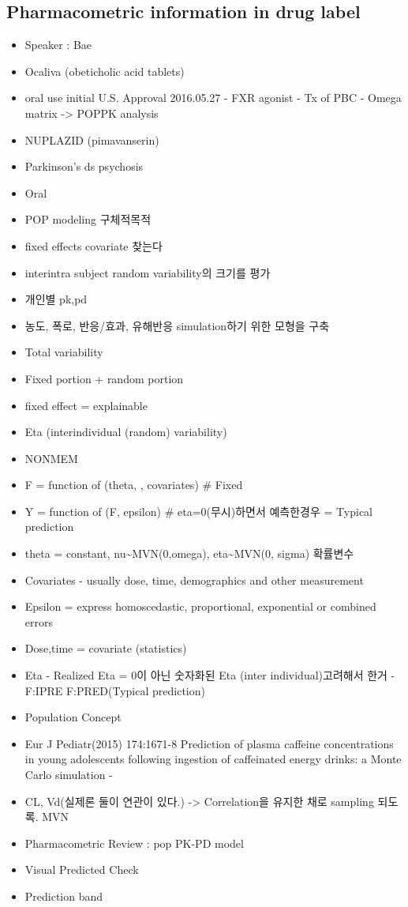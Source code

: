 \documentclass[]{book}
\begin{document}
\subsection{Pharmacometric information in drug
label}\label{pharmacometric-information-in-drug-label}

\begin{itemize}
\item
  Speaker : Bae
\item
  Ocaliva (obeticholic acid tablets)
\item
  oral use \textbar{} initial U.S. Approval 2016.05.27 - FXR agonist -
  Tx of PBC - Omega matrix -\textgreater{} POPPK analysis
\item
  NUPLAZID (pimavanserin)
\item
  Parkinson's ds psychosis
\item
  Oral
\item
  POP modeling 구체적목적
\item
  fixed effects covariate 찾는다
\item
  interintra subject random variability의 크기를 평가
\item
  개인별 pk,pd
\item
  농도, 폭로, 반응/효과, 유해반응 simulation하기 위한 모형을 구축
\item
  Total variability
\item
  Fixed portion + random portion
\item
  fixed effect = explainable
\item
  Eta (interindividual (random) variability)
\item
  NONMEM
\item
  F = function of (theta, , covariates) \# Fixed
\item
  Y = function of (F, epsilon) \# eta=0(무시)하면서 예측한경우 = Typical
  prediction
\item
  theta = constant, nu\textasciitilde{}MVN(0,omega),
  eta\textasciitilde{}MVN(0, sigma) 확률변수
\item
  Covariates - usually dose, time, demographics and other measurement
\item
  Epsilon = express homoscedastic, proportional, exponential or combined
  errors
\item
  Dose,time = covariate (statistics)
\item
  Eta - Realized Eta = 0이 아닌 숫자화된 Eta (inter individual)고려해서
  한거 - F:IPRE F:PRED(Typical prediction)
\item
  Population Concept
\item
  Eur J Pediatr(2015) 174:1671-8 Prediction of plasma caffeine
  concentrations in young adolescents following ingestion of caffeinated
  energy drinks: a Monte Carlo simulation - \citep{Lee_2015}
\item
  CL, Vd(실제론 둘이 연관이 있다.) -\textgreater{} Correlation을 유지한
  채로 sampling 되도록. MVN
\item
  Pharmacometric Review : pop PK-PD model
\item
  Visual Predicted Check
\item
  Prediction band
\end{itemize}
\end{document}
